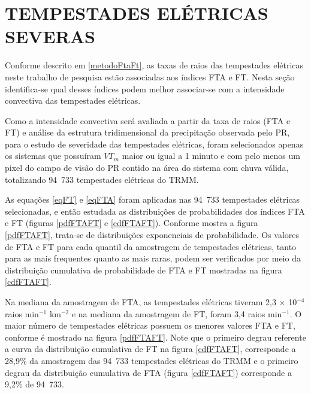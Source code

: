\chapter{TEMPESTADES ELÉTRICAS SEVERAS}

Conforme descrito em \ref{metodoFtaFt}, as taxas de raios das tempestades elétricas neste trabalho de pesquisa estão associadas aos índices FTA e FT. Nesta seção identifica-se qual desses índices podem melhor associar-se com a intensidade convectiva das tempestades elétricas.


Como a intensidade convectiva será avaliada a partir da taxa de raios (FTA e FT) e análise da estrutura tridimensional da precipitação observada pelo PR, para o estudo de severidade das tempestades elétricas, foram selecionados apenas os sistemas que possuíram $VT_m$ maior ou igual a 1 minuto e com pelo menos um pixel do campo de visão do PR contido na área do sistema com chuva válida, totalizando {94~733} tempestades elétricas do TRMM. 



As equações \ref{eqFT} e \ref{eqFTA} foram aplicadas nas {94~733} tempestades elétricas selecionadas, e então estudada as distribuições de probabilidades dos índices FTA e FT (figuras \ref{pdfFTAFT} e \ref{cdfFTAFT}). Conforme mostra a figura \ref{pdfFTAFT}, trata-se de distribuições exponenciais de probabilidade. Os valores de FTA e FT para cada quantil da amostragem de tempestades elétricas, tanto para as mais frequentes quanto as mais raras, podem ser verificados por meio da distribuição cumulativa de probabilidade de FTA e FT mostradas na figura \ref{cdfFTAFT}. 

Na mediana da amostragem de FTA,  as tempestades elétricas tiveram 2,3 $\times$ 10$^{-4}$ raios min$^{-1}$ km$^{-2}$  e na mediana da amostragem de FT, foram 3,4 raios min$^{-1}$. O maior número de tempestades elétricas possuem os menores valores FTA e FT, conforme é mostrado na figura \ref{pdfFTAFT}. Note que o primeiro degrau referente a curva da distribuição cumulativa de FT na figura \ref{cdfFTAFT}, corresponde a 28,9\% da amostragem das {94~733} tempestades elétricas do TRMM e o primeiro degrau da distribuição cumulativa de FTA (figura \ref{cdfFTAFT}) corresponde a 9,2\% de {94~733}. 

